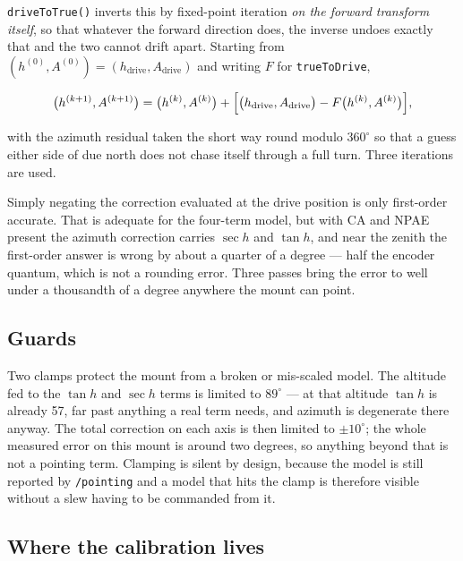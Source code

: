 \documentclass[11pt,a4paper]{article}
\begin{document}
\texttt{driveToTrue()} inverts this by fixed-point iteration \emph{on the forward transform itself}, so that whatever the forward direction does, the inverse undoes exactly that and the two cannot drift apart. Starting from $(h^{(0)}, A^{(0)}) = (h_\text{drive}, A_\text{drive})$ and writing $F$ for \texttt{trueToDrive},

\begin{equation}
\bigl(h^{(k+1)}, A^{(k+1)}\bigr) = \bigl(h^{(k)}, A^{(k)}\bigr) + \Bigl[\bigl(h_\text{drive}, A_\text{drive}\bigr) - F\bigl(h^{(k)}, A^{(k)}\bigr)\Bigr],
\end{equation}

with the azimuth residual taken the short way round modulo $360^\circ$ so that a guess either side of due north does not chase itself through a full turn. Three iterations are used.

Simply negating the correction evaluated at the drive position is only first-order accurate. That is adequate for the four-term model, but with CA and NPAE present the azimuth correction carries $\sec h$ and $\tan h$, and near the zenith the first-order answer is wrong by about a quarter of a degree --- half the encoder quantum, which is not a rounding error. Three passes bring the error to well under a thousandth of a degree anywhere the mount can point.

\subsection{Guards}

Two clamps protect the mount from a broken or mis-scaled model. The altitude fed to the $\tan h$ and $\sec h$ terms is limited to $89^\circ$ --- at that altitude $\tan h$ is already 57, far past anything a real term needs, and azimuth is degenerate there anyway. The total correction on each axis is then limited to $\pm10^\circ$; the whole measured error on this mount is around two degrees, so anything beyond that is not a pointing term. Clamping is silent by design, because the model is still reported by \texttt{/pointing} and a model that hits the clamp is therefore visible without a slew having to be commanded from it.

\subsection{Where the calibration lives}
\end{document}
